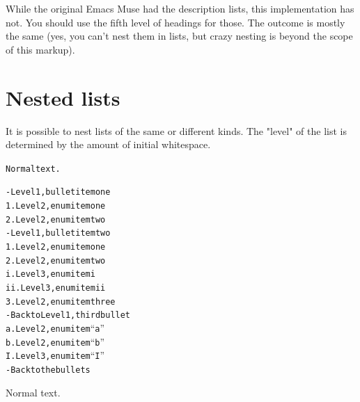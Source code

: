 \documentclass[DIV=12,%
               BCOR=0mm,%
               fontsize=10pt,%
               oneside,%
               paper=210mm:11in]{scrbook}
\begin{document}
While the original Emacs Muse had the description lists, this
implementation has not. You should use the fifth level of headings for
those. The outcome is mostly the same (yes, you can't nest them in
lists, but crazy nesting is beyond the scope of this markup).

\section{Nested lists}


It is possible to nest lists of the same or different kinds.  The
"level" of the list is determined by the amount of initial whitespace.


\begin{alltt}
Normal text.

 - Level 1, bullet item one
   1. Level 2, enum item one
   2. Level 2, enum item two
 - Level 1, bullet item two
   1. Level 2, enum item one
   2. Level 2, enum item two
      i.  Level 3, enum item i
      ii. Level 3, enum item ii
   3. Level 2, enum item three
 - Back to Level 1, third bullet
   a. Level 2, enum item “a”
   b. Level 2, enum item “b”
      I. Level 3, enum item “I”
 - Back to the bullets

\end{alltt}


Normal text.
\end{document}
